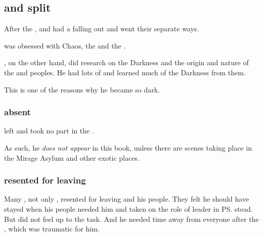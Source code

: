 \subsection{\Ishnaruchaefir{} and \Secherdamon{} split}
After the , \Ishnaruchaefir{} and \Secherdamon{} had a falling out and went their separate ways. 

\Secherdamon{} was obsessed with Chaos, the \xzaishanns{} and the \firstgendragons. 

\Ishnaruchaefir, on the other hand, did research on the Darkness and the origin and nature of the \bane{} and \resphan{} peoples. He had lots of  and learned much of the Darkness from them. 

This is one of the reasons why he became so dark. 






\subsubsection{\Ishnaruchaefir{} absent}
\Ishnaruchaefir{} left \Miith{} and took no part in the \resphanwars. 

As such, he \emph{does not appear} in this book, unless there are scenes taking place in the Mirage Asylum and other exotic places. 






\subsubsection{\Ishnaruchaefir{} resented for leaving}
Many \dragons, not only \Secherdamon, resented \Ishnaruchaefir{} for leaving and  his people.
They felt he should have stayed when his people needed him and taken on the role of leader in \ps{\Nexagglachel} stead. 
But \Ishnaruchaefir{} did not feel up to the task. 
And he needed time away from everyone after the \SecondShrouding, which was traumatic for him. 









